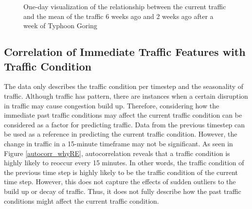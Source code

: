 \begin{figure}[h] 
\centering
  \centering
  \caption{One-day visualization of the relationship between the current traffic and the mean of the traffic 6 weeks ago and 2 weeks ago after a week of Typhoon Goring}
  \label{figure_traffic_mean_2weeks_vs_6weeks_disrupted}
\end{figure}



\subsection{Correlation of Immediate Traffic Features with Traffic Condition}

The data only describes the traffic condition per timestep and the seasonality of traffic. Although traffic has pattern, there are instances when a certain disruption in traffic may cause congestion build up. Therefore, considering how the immediate past traffic conditions may affect the current traffic condition can be considered as a factor for predicting traffic. Data  from the previous timestep can be used as a reference in predicting the current traffic condition. However, the change in traffic in a 15-minute timeframe may not be significant. As seen in Figure \ref{autocorr_whyRE}, autocorrelation reveals that a traffic condition is highly likely to reoccur every 15 minutes. In other words, the traffic condition of the previous time step is highly likely to be the traffic condition of the current time step. However, this does not capture the effects of sudden outliers to the build up or decay of traffic. Thus, it does not fully describe how the past traffic conditions might affect the current traffic condition. 


